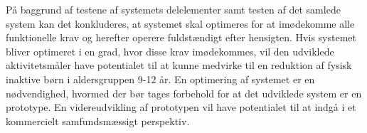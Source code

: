 På baggrund af testene af systemets delelementer samt testen af det samlede system kan det konkluderes, at systemet skal optimeres for at imødekomme alle funktionelle krav og herefter operere fuldstændigt efter hensigten. Hvis systemet bliver optimeret i en grad, hvor disse krav imødekommes, vil den udviklede aktivitetsmåler have potentialet til at kunne medvirke til en reduktion af fysisk inaktive børn i aldersgruppen 9-12 år. En optimering af systemet er en nødvendighed, hvormed der bør tages forbehold for at det udviklede system er en prototype. En videreudvikling af prototypen vil have potentialet til at indgå i et kommercielt samfundsmæssigt perspektiv.